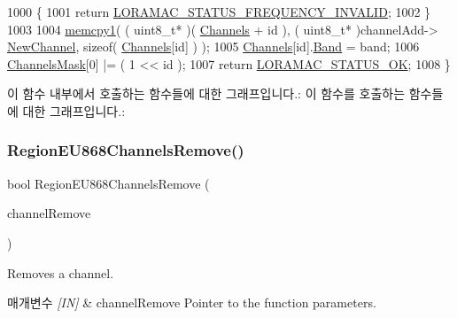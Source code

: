 \begin{DoxyCode}
1000     \{
1001         \textcolor{keywordflow}{return} \mbox{\hyperlink{group___l_o_r_a_m_a_c_gga1d18f26b344040b3ec5c3db662919661ae3ea7b89796aed5a320013d9743b2955}{LORAMAC\_STATUS\_FREQUENCY\_INVALID}};
1002     \}
1003 
1004     \mbox{\hyperlink{utilities_8c_abfbe672c7136122f16c9214bc4ba8d21}{memcpy1}}( ( uint8\_t* )( \mbox{\hyperlink{_region_e_u868_8c_a2f381382b4cbbe721da7b980ec467229}{Channels}} + \textcolor{keywordtype}{id} ), ( uint8\_t* )channelAdd->
      \mbox{\hyperlink{structs_channel_add_params_afc31493a105479490228fd896b20b45c}{NewChannel}}, \textcolor{keyword}{sizeof}( \mbox{\hyperlink{_region_e_u868_8c_a2f381382b4cbbe721da7b980ec467229}{Channels}}[\textcolor{keywordtype}{id}] ) );
1005     \mbox{\hyperlink{_region_e_u868_8c_a2f381382b4cbbe721da7b980ec467229}{Channels}}[id].\mbox{\hyperlink{structs_channel_params_a724c03aa06953111c3291243831f251b}{Band}} = band;
1006     \mbox{\hyperlink{_region_e_u868_8c_a2188957b5ca6af8092154d7ccbfa5757}{ChannelsMask}}[0] |= ( 1 << id );
1007     \textcolor{keywordflow}{return} \mbox{\hyperlink{group___l_o_r_a_m_a_c_gga1d18f26b344040b3ec5c3db662919661a03db5fca052313edb3823c014b653a74}{LORAMAC\_STATUS\_OK}};
1008 \}
\end{DoxyCode}
이 함수 내부에서 호출하는 함수들에 대한 그래프입니다.\+:
이 함수를 호출하는 함수들에 대한 그래프입니다.\+:
\mbox{\label{group___r_e_g_i_o_n_e_u868_gac30e0032ee1e6f09d4ee032e7169e238}} 
\subsubsection{\texorpdfstring{Region\+E\+U868\+Channels\+Remove()}{RegionEU868ChannelsRemove()}}
{\footnotesize\ttfamily bool Region\+E\+U868\+Channels\+Remove (\begin{DoxyParamCaption}\item[{\mbox{\hyperlink{group___r_e_g_i_o_n_gaa37468560d2fc81a977b57a48e5d72c0}{Channel\+Remove\+Params\+\_\+t}} $\ast$}]{channel\+Remove }\end{DoxyParamCaption})}



Removes a channel. 


\begin{DoxyParams}{매개변수}
{\em \mbox{[}\+I\+N\mbox{]}} & channel\+Remove Pointer to the function parameters.\\
\hline
\end{DoxyParams}

